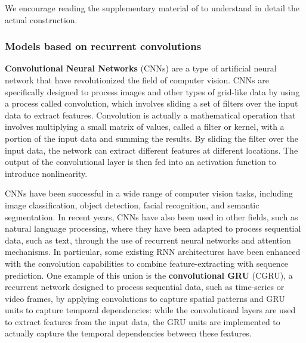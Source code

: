 \documentclass{article}
\begin{document}
We encourage reading the supplementary material of \cite{PER19} to understand in detail the actual construction.

\subsubsection{Models based on recurrent convolutions}
\textbf{Convolutional Neural Networks} (CNNs) are a type of artificial neural network that have revolutionized the field of computer vision. CNNs are specifically designed to process images and other types of grid-like data by using a process called convolution, which involves sliding a set of filters over the input data to extract features. Convolution is actually a mathematical operation that involves multiplying a small matrix of values, called a filter or kernel, with a portion of the input data and summing the results. By sliding the filter over the input data, the network can extract different features at different locations. The output of the convolutional layer is then fed into an activation function to introduce nonlinearity.

CNNs have been successful in a wide range of computer vision tasks, including image classification, object detection, facial recognition, and semantic segmentation. In recent years, CNNs have also been used in other fields, such as natural language processing, where they have been adapted to process sequential data, such as text, through the use of recurrent neural networks and attention mechanisms. In particular, some existing RNN architectures have been enhanced with the convolution capabilities to combine feature-extracting with sequence prediction. One example of this union is the \textbf{convolutional GRU} (CGRU), a recurrent network designed to process sequential data, such as time-series or video frames, by applying convolutions to capture spatial patterns and GRU units to capture temporal dependencies: while the convolutional layers are used to extract features from the input data, the GRU units are implemented to actually capture the temporal dependencies between these features.
\end{document}
